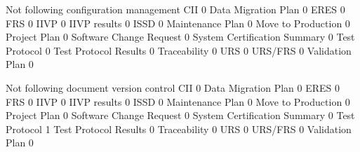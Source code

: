 \documentclass{article}
\begin{document}
\begin{Schunk}
\begin{Soutput}
                               Not following configuration management
  CII                                                               0
  Data Migration Plan                                               0
  ERES                                                              0
  FRS                                                               0
  IIVP                                                              0
  IIVP results                                                      0
  ISSD                                                              0
  Maintenance Plan                                                  0
  Move to Production                                                0
  Project Plan                                                      0
  Software Change Request                                           0
  System Certification Summary                                      0
  Test Protocol                                                     0
  Test Protocol Results                                             0
  Traceability                                                      0
  URS                                                               0
  URS/FRS                                                           0
  Validation Plan                                                   0
                              
                               Not following document version control
  CII                                                               0
  Data Migration Plan                                               0
  ERES                                                              0
  FRS                                                               0
  IIVP                                                              0
  IIVP results                                                      0
  ISSD                                                              0
  Maintenance Plan                                                  0
  Move to Production                                                0
  Project Plan                                                      0
  Software Change Request                                           0
  System Certification Summary                                      0
  Test Protocol                                                     1
  Test Protocol Results                                             0
  Traceability                                                      0
  URS                                                               0
  URS/FRS                                                           0
  Validation Plan                                                   0
                              

\end{Soutput}
\end{Schunk}
\end{document}
